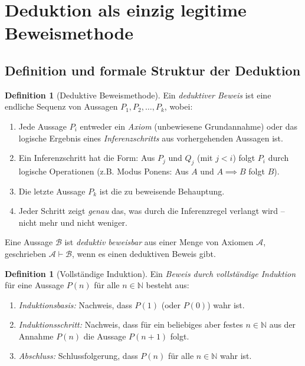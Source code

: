 \documentclass[12pt, a4paper]{article}
\theoremstyle{definition}
\newtheorem{definition}[theorem]{Definition}
\theoremstyle{remark}
\newcommand{\N}{\mathbb{N}}
\begin{document}
\section{Deduktion als einzig legitime Beweismethode}
\label{sec:deduktion}

\subsection{Definition und formale Struktur der Deduktion}
\label{subsec:deduktion_def}

\begin{definition}[Deduktive Beweismethode]
\label{def:deduktion}
Ein \emph{deduktiver Beweis} ist eine endliche Sequenz von Aussagen $P_1, P_2, \ldots, P_k$, wobei:
\begin{enumerate}[label=(\alph*)]
  \item Jede Aussage $P_i$ entweder ein \emph{Axiom} (unbewiesene Grundannahme) oder das logische Ergebnis eines \emph{Inferenzschritts} aus vorhergehenden Aussagen ist.
  \item Ein Inferenzschritt hat die Form: Aus $P_j$ und $Q_j$ (mit $j < i$) folgt $P_i$ durch logische Operationen (z.B. Modus Ponens: Aus $A$ und $A \implies B$ folgt $B$).
  \item Die letzte Aussage $P_k$ ist die zu beweisende Behauptung.
  \item Jeder Schritt zeigt \emph{genau} das, was durch die Inferenzregel verlangt wird -- nicht mehr und nicht weniger.
\end{enumerate}

Eine Aussage $\mathcal{B}$ ist \emph{deduktiv beweisbar} aus einer Menge von Axiomen $\mathcal{A}$, geschrieben $\mathcal{A} \vdash \mathcal{B}$, wenn es einen deduktiven Beweis gibt.
\end{definition}

\begin{definition}[Vollständige Induktion]
\label{def:vollstaendige_induktion}
Ein \emph{Beweis durch vollständige Induktion} für eine Aussage $P(n)$ für alle $n \in \N$ besteht aus:
\begin{enumerate}[label=(\roman*)]
  \item \emph{Induktionsbasis:} Nachweis, dass $P(1)$ (oder $P(0)$) wahr ist.
  \item \emph{Induktionsschritt:} Nachweis, dass für ein beliebiges aber festes $n \in \N$ aus der Annahme $P(n)$ die Aussage $P(n+1)$ folgt.
  \item \emph{Abschluss:} Schlussfolgerung, dass $P(n)$ für alle $n \in \N$ wahr ist.
\end{enumerate}
\end{definition}
\end{document}
